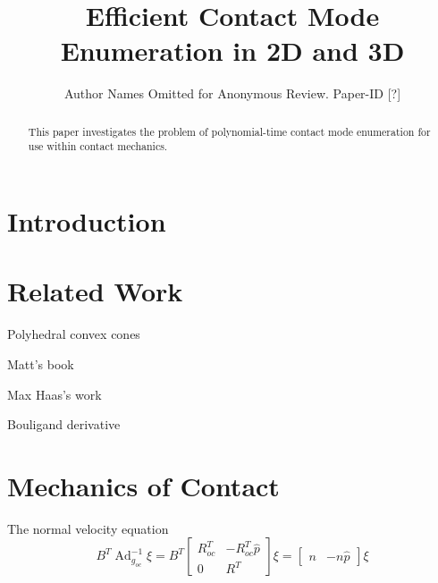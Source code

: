\documentclass[conference]{IEEEtran}
\DeclareMathOperator{\adjoint}{Ad}
\begin{document}
\title{\huge Efficient Contact Mode Enumeration in 2D and 3D}

\author{Author Names Omitted for Anonymous Review. Paper-ID [?]}



\maketitle

\begin{abstract}
This paper investigates the problem of polynomial-time contact mode enumeration
for use within contact mechanics.
\end{abstract}
 
\IEEEpeerreviewmaketitle

\section{Introduction}

\section{Related Work}

\begin{inparaenum}
    \item Polyhedral convex cones
    \item Matt's book
    \item Max Haas's work
    \item Bouligand derivative
\end{inparaenum}

\section{Mechanics of Contact}

The normal velocity equation
\begin{equation}
B^T\adjoint_{g_{oc}}^{-1}\xi = 
B^T \begin{bmatrix}
        R_{oc}^T & -R_{oc}^T\widehat{p}\\
        0 & R^T
    \end{bmatrix}\xi = 
\begin{bmatrix} n & -n\widehat{p} \end{bmatrix}\xi
\end{equation}
\end{document}
